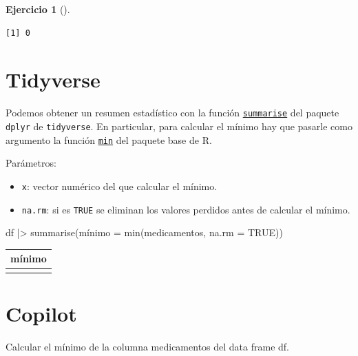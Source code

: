 \documentclass[
  a4paper,
]{scrreport}
\newenvironment{Shaded}{\begin{snugshade}}{\end{snugshade}}
\newcommand{\AttributeTok}[1]{\textcolor[rgb]{0.40,0.45,0.13}{#1}}
\newcommand{\ConstantTok}[1]{\textcolor[rgb]{0.56,0.35,0.01}{#1}}
\newcommand{\ExtensionTok}[1]{\textcolor[rgb]{0.00,0.23,0.31}{#1}}
\newcommand{\FunctionTok}[1]{\textcolor[rgb]{0.28,0.35,0.67}{#1}}
\newcommand{\NormalTok}[1]{\textcolor[rgb]{0.00,0.23,0.31}{#1}}
\newcommand{\OtherTok}[1]{\textcolor[rgb]{0.00,0.23,0.31}{#1}}
\newcommand{\SpecialCharTok}[1]{\textcolor[rgb]{0.37,0.37,0.37}{#1}}
\providecommand{\tightlist}{%
  \setlength{\itemsep}{0pt}\setlength{\parskip}{0pt}}\usepackage{longtable,booktabs,array}
\theoremstyle{definition}
\newtheorem{exercise}{Ejercicio}[chapter]
\theoremstyle{remark}
\begin{document}
\begin{exercise}[]
\begin{enumerate}
\begin{tcolorbox}
\begin{verbatim}
[1] 0
\end{verbatim}

  \section{Tidyverse}

  Podemos obtener un resumen estadístico con la función
  \href{https://dplyr.tidyverse.org/reference/summarise.html}{\texttt{summarise}}
  del paquete \texttt{dplyr} de \texttt{tidyverse}. En particular, para
  calcular el mínimo hay que pasarle como argumento la función
  \href{https://www.rdocumentation.org/packages/base/versions/3.6.2/topics/min}{\texttt{min}}
  del paquete base de R.

  Parámetros:

  \begin{itemize}
  \tightlist
  \item
    \texttt{x}: vector numérico del que calcular el mínimo.
  \item
    \texttt{na.rm}: si es \texttt{TRUE} se eliminan los valores perdidos
    antes de calcular el mínimo.
  \end{itemize}

\begin{Shaded}
\begin{Highlighting}[]
\NormalTok{df }\SpecialCharTok{|\textgreater{}} \FunctionTok{summarise}\NormalTok{(mínimo }\OtherTok{=} \FunctionTok{min}\NormalTok{(medicamentos, }\AttributeTok{na.rm =} \ConstantTok{TRUE}\NormalTok{))}
\end{Highlighting}
\end{Shaded}

  \begin{longtable}[]{@{}r@{}}
  \toprule\noalign{}
  mínimo \\
  \midrule\noalign{}
  \endhead
  \bottomrule\noalign{}
  \endlastfoot
  0 \\
  \end{longtable}

  \section{Copilot}

\begin{Shaded}
\begin{Highlighting}[]
\ExtensionTok{Calcular}\NormalTok{ el mínimo de la columna medicamentos del data frame df.}
\end{Highlighting}
\end{Shaded}


\end{tcolorbox}
\end{enumerate}
\end{exercise}
\end{document}
